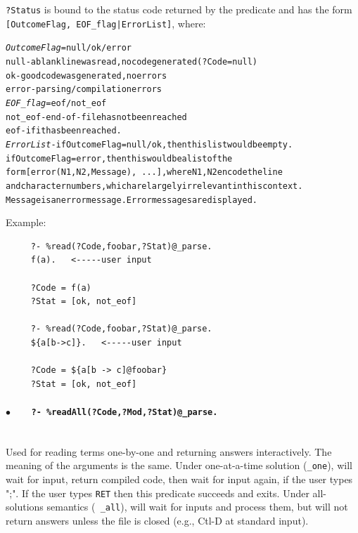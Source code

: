 \documentclass[11pt]{article}
\begin{document}
{\tt ?Status} is bound to the status code returned by the predicate and has
the form {\tt [OutcomeFlag, EOF\_flag|ErrorList]}, where:
\begin{alltt}
{\rm \emph{OutcomeFlag} = null/ok/error
                  null  - a blank line was read, no code generated (?Code = null)
                  ok    - good code was generated, no errors
                  error - parsing/compilation errors
  \emph{EOF\_flag} = eof/not\_eof
                  not\_eof -  end-of-file has not been reached
                  eof       -  if it has been reached. 
  \emph{ErrorList} - if OutcomeFlag=null/ok, then this list would be empty.
                  if OutcomeFlag=error, then this would be a list of the
                        form {\tt [error(N1,N2,Message), ...]}, where N1, N2 encode the line
                        and character numbers, which are largely irrelevant in this context.
                        Message is an error message. Error messages are displayed.}
\end{alltt}
  Example:
\begin{verbatim}
     ?- %read(?Code,foobar,?Stat)@_parse.
     f(a).   <-----user input

     ?Code = f(a)
     ?Stat = [ok, not_eof]

     ?- %read(?Code,foobar,?Stat)@_parse.
     ${a[b->c]}.   <-----user input

     ?Code = ${a[b -> c]@foobar}
     ?Stat = [ok, not_eof]
\end{verbatim}
  \paragraph{$\bullet$~~~ \tt ?- \%readAll(?Code,?Mod,?Stat)@\_parse.} ~~\\
  Used for reading terms one-by-one and returning answers interactively.
  The meaning of the arguments is the same.  Under one-at-a-time solution
  ({\tt \_one}), will wait for input, return compiled code, then wait for
  input again, if the user types ";". If the user types {\tt RET} then this
  predicate succeeds and exits.  Under all-solutions semantics ({\tt
    \_all}), will wait for inputs and process them, but will not return
  answers unless the file is closed (e.g., Ctl-D at standard input).
\end{document}

